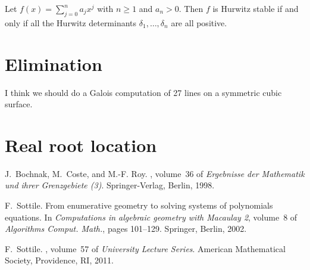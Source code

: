 \documentclass[12pt]{amsart}
\theoremstyle{definition}
\begin{document}


\theorem
Let $f(x) = \sum_{j=0}^{n}a_{j}x^{j}$ with $n\geq 1$ and $a_{n}>0$. Then $f$ is Hurwitz stable if and only if all the Hurwitz determinants $\delta_{1},\dots,\delta_{n}$ are all positive.
%
%

\section{Elimination}
%

I think we should do a Galois computation of 27 lines on a symmetric cubic surface.


\section{Real root location}
%




\begin{thebibliography}{1}

J.~Bochnak, M.~Coste, and M.-F. Roy.
, volume~36 of {\em Ergebnisse der
  Mathematik und ihrer Grenzgebiete (3)}.
\newblock Springer-Verlag, Berlin, 1998.

F.~Sottile.
\newblock From enumerative geometry to solving systems of polynomials
  equations.
\newblock In {\em Computations in algebraic geometry with {M}acaulay 2},
  volume~8 of {\em Algorithms Comput. Math.}, pages 101--129. Springer, Berlin,
  2002.

F.~Sottile.
, volume~57 of {\em
  University Lecture Series}.
\newblock American Mathematical Society, Providence, RI, 2011.

\end{thebibliography}
\end{document}
